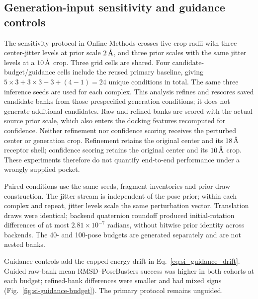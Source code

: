 \documentclass{article}
\newcommand{\angstrom}{\text{\normalfont\AA}}
\begin{document}
\subsection{Generation-input sensitivity and guidance controls}

The sensitivity protocol in Online Methods crosses five crop radii with three center-jitter levels at prior scale \(2\,\angstrom\), and three prior scales with the same jitter levels at a \(10\,\angstrom\) crop. Three grid cells are shared. Four candidate-budget/guidance cells include the reused primary baseline, giving \(5\times3+3\times3-3+(4-1)=24\) unique conditions in total. The same three inference seeds are used for each complex. This analysis refines and rescores saved candidate banks from those prespecified generation conditions; it does not generate additional candidates. Raw and refined banks are scored with the actual source prior scale, which also enters the docking features recomputed for confidence. Neither refinement nor confidence scoring receives the perturbed center or generation crop. Refinement retains the original center and its \(18\,\angstrom\) receptor shell; confidence scoring retains the original center and its \(10\,\angstrom\) crop. These experiments therefore do not quantify end-to-end performance under a wrongly supplied pocket.

Paired conditions use the same seeds, fragment inventories and prior-draw construction. The jitter stream is independent of the pose prior; within each complex and repeat, jitter levels scale the same perturbation vector. Translation draws were identical; backend quaternion roundoff produced initial-rotation differences of at most \(2.81\times10^{-7}\) radians, without bitwise prior identity across backends. The 40- and 100-pose budgets are generated separately and are not nested banks.

Guidance controls add the capped energy drift in Eq.~\eqref{eq:si_guidance_drift}. Guided raw-bank mean RMSD--PoseBusters success was higher in both cohorts at each budget; refined-bank differences were smaller and had mixed signs (Fig.~\ref{fig:si-guidance-budget}). The primary protocol remains unguided.
\end{document}
